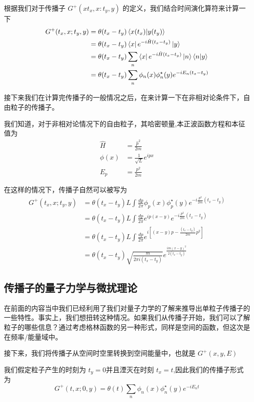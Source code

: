 \documentclass{article}
\begin{document}
根据我们对于传播子 $G^{+}(xt_x,x:t_y,y)$ 的定义，我们结合时间演化算符来计算一下
\begin{align*}
    G^{+}(t_x,x;t_y,y) &= \theta(t_x - t_y) \braket{x(t_x)}{y(t_y)} \\
    &= \theta(t_x - t_y)\bra{x}e^{-i\hat{H}(t_x - t_y)}\ket{y} \\
    &= \theta(t_x - t_y)\sum_n\bra{x}e^{-i\hat{H}(t_x - t_y)}\ket{n}\bra{n}\ket{y} \\
    &= \theta(t_x - t_y)\sum_n \phi_n(x)\phi_n^\star(y)e^{-iE_n(t_x - t_y)}
\end{align*}

接下来我们在计算完传播子的一般情况之后，在来计算一下在非相对论条件下，自由粒子的传播子。

我们知道，对于非相对论情况下的自由粒子，其哈密顿量,本正波函数方程和本征值为
\begin{align*}
    \hat{H} &= \frac{\hat{p}^2}{2m} \\
    \phi(x) &= \frac{1}{\sqrt{L}}e^{ipx} \\
    E_p &= \frac{p^2}{2m}
\end{align*}

在这样的情况下，传播子自然可以被写为
\begin{align*}
    G^{+}(t_x,x;t_y,y) &= \theta(t_x - t_y) L\int \frac{dp}{2\pi} \phi_p(x) \phi_p^\star(y) e^{-i\frac{p^2}{2m}(t_x - t_y)} \\
    &= \theta(t_x - t_y) L\int \frac{dp}{2\pi} e^{ip(x - y)} e^{-i\frac{p^2}{2m}(t_x - t_y)} \\
    &= \theta(t_x - t_y) L\int \frac{dp}{2\pi} e^{i[(x - y)p - \frac{(t_x - t_y)}{2m}p^2]} \\
    &= \theta(t_x - t_y) \sqrt{\frac{m}{2\pi i(t_x - t_y)}} e^{\frac{im(x - y)^2}{2(t_x - t_y)}}
\end{align*}



\subsection{传播子的量子力学与微扰理论}
在前面的内容当中我们已经利用了我们对量子力学的了解来推导出单粒子传播子的一些特性。事实上，我们想扭转这种情况。如果我们从传播子开始，我们可以了解粒子的哪些信息？通过考虑格林函数的另一种形式，同样是空间的函数，但这次是在频率/能量域中。

接下来，我们将传播子从空间时空里转换到空间能量中，也就是 $G^{+}(x,y,E)$

我们假定粒子产生的时刻为 $t_y = 0$并且湮灭在时刻 $t_x = t$,因此我们的传播子形式为
\begin{equation*}
    G^{+}(t,x;0,y) = \theta(t) \sum_n \phi_n(x)\phi_n^\star(y)e^{-iE_n t}
\end{equation*}
\end{document}
